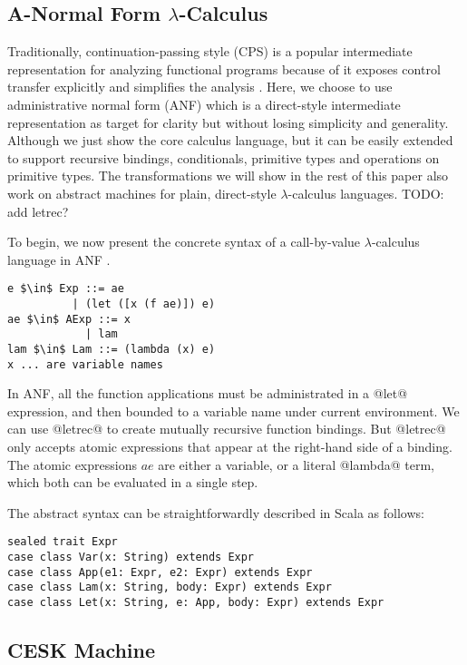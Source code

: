 \documentclass[acmsmall,review,anonymous]{acmart}\settopmatter{printfolios=true,printccs=false,printacmref=false}
\begin{document}
\subsection{A-Normal Form $\lambda$-Calculus} \label{anfsyntax}

Traditionally, continuation-passing style (CPS) is a popular intermediate representation
for analyzing functional programs because of it exposes control transfer explicitly
and simplifies the analysis \cite{Shivers:1991:SSC:115865.115884, Shivers:1988:CFA:53990.54007}.
Here, we choose to use administrative normal form (ANF) which is a direct-style intermediate representation 
as target for clarity but without losing simplicity and generality.
Although we just show the core calculus language, but it can be easily extended
to support recursive bindings, conditionals, primitive types and operations on primitive types.
The transformations we will show in the rest of this paper
also work on abstract machines for plain, direct-style $\lambda$-calculus languages.
TODO: add letrec?

To begin, we now present the concrete syntax of a call-by-value $\lambda$-calculus language 
in ANF \cite{flanagan1993essence}.

\begin{lstlisting}
e $\in$ Exp ::= ae
          | (let ([x (f ae)]) e)
ae $\in$ AExp ::= x            
            | lam
lam $\in$ Lam ::= (lambda (x) e)
x ... are variable names
\end{lstlisting}

In ANF, all the function applications must be administrated in a @let@ expression,
and then bounded to a variable name under current environment.
We can use @letrec@ to create mutually recursive function bindings. But @letrec@
only accepts atomic expressions that appear at the right-hand side of a binding.
The atomic expressions $ae$ are either a variable, or a literal @lambda@ term, which
both can be evaluated in a single step.

The abstract syntax can be straightforwardly described in Scala as follows:

\begin{lstlisting}
sealed trait Expr
case class Var(x: String) extends Expr
case class App(e1: Expr, e2: Expr) extends Expr
case class Lam(x: String, body: Expr) extends Expr
case class Let(x: String, e: App, body: Expr) extends Expr
\end{lstlisting}

\subsection{CESK Machine} \label{cesk}
\end{document}
